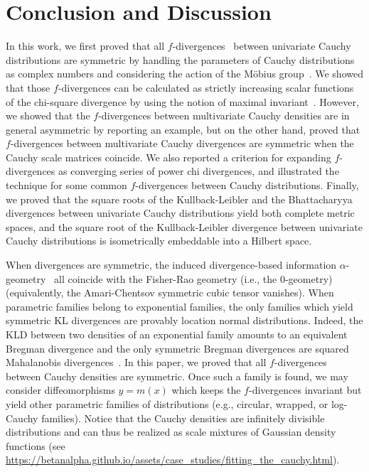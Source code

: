 \documentclass[journal]{IEEEtran}
\begin{document}




\section{Conclusion and Discussion}\label{sec:concl}
 
In this work, we first proved that all $f$-divergences~\cite{csiszar2004information} between univariate Cauchy distributions are symmetric by handling the parameters of Cauchy distributions as complex numbers and considering the action of the M\"obius group~\cite{mccullagh1996mobius}.  
We showed that those $f$-divergences can be calculated as strictly increasing scalar functions of the chi-square divergence by using the notion of maximal invariant~\cite{Eaton-1989,mccullagh1992conditional}. 
However, we showed that the $f$-divergences between multivariate Cauchy densities are in general asymmetric by reporting an example, 
but on the other hand, proved that $f$-divergences between multivariate Cauchy divergences are symmetric when the Cauchy scale matrices coincide. 
We also reported a criterion for expanding $f$-divergences as converging series of power chi divergences, and illustrated the technique for some common $f$-divergences between Cauchy distributions. 
Finally, we proved that the square roots of the Kullback-Leibler and the Bhattacharyya divergences between univariate Cauchy distributions yield both complete metric spaces, and the square root of the Kullback-Leibler divergence between univariate Cauchy distributions is isometrically embeddable into a Hilbert space. 

When divergences are symmetric, the induced divergence-based information $\alpha$-geometry~\cite{IG-2016} all coincide with the Fisher-Rao geometry (i.e., the $0$-geometry)
 (equivalently, the Amari-Chentsov symmetric cubic tensor vanishes).
When parametric families belong to exponential families, the only families which yield symmetric KL divergences are provably location normal distributions.
Indeed, the KLD between two densities of an exponential family amounts to an equivalent Bregman divergence and the only symmetric Bregman divergences
are squared Mahalanobis divergences~\cite{BVD-2010}.
In this paper, we proved that all $f$-divergences between Cauchy densities are symmetric.
Once such a family is found, we may consider diffeomorphisms $y=m(x)$ which keeps the $f$-divergences invariant
but yield other parametric families of distributions (e.g., circular, wrapped, or log-Cauchy families).
Notice that the Cauchy densities  are infinitely divisible distributions and can thus be realized as scale mixtures of Gaussian density functions
(see \url{https://betanalpha.github.io/assets/case_studies/fitting_the_cauchy.html}).
\end{document}
